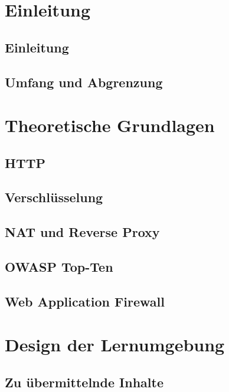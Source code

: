 \documentclass[a4paper, 11pt]{article}
\begin{document}
    
    
    

    \section{Einleitung}
    \subsection{Einleitung}
    
    \subsection{Umfang und Abgrenzung}
    
    \pagebreak

    \section{Theoretische Grundlagen}
    \subsection{HTTP}
    
    \subsection{Verschlüsselung}
    
    \subsection{NAT und Reverse Proxy}
    
    \subsection{OWASP Top-Ten}
    
    \subsection{Web Application Firewall}
    
    \pagebreak

    \section{Design der Lernumgebung}
    \subsection{Zu übermittelnde Inhalte}
    \label{chap:inhalte}
    
\end{document}
